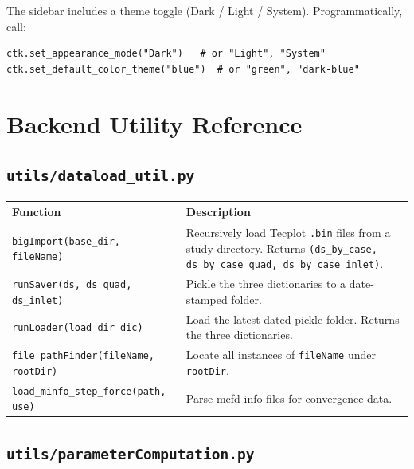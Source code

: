 \documentclass[11pt,letterpaper]{article}
\begin{document}
The sidebar includes a theme toggle (Dark / Light / System).
Programmatically, call:

\begin{lstlisting}
ctk.set_appearance_mode("Dark")   # or "Light", "System"
ctk.set_default_color_theme("blue")  # or "green", "dark-blue"
\end{lstlisting}

\section{Backend Utility Reference}

\subsection{\texttt{utils/dataload\_util.py}}

\begin{table}[h]
\centering
\small
\begin{tabular}{lp{8cm}}
\toprule
\textbf{Function} & \textbf{Description} \\
\midrule
\texttt{bigImport(base\_dir, fileName)} &
  Recursively load Tecplot \texttt{.bin} files from a study directory.
  Returns \texttt{(ds\_by\_case, ds\_by\_case\_quad, ds\_by\_case\_inlet)}.\\
\texttt{runSaver(ds, ds\_quad, ds\_inlet)} &
  Pickle the three dictionaries to a date-stamped folder.\\
\texttt{runLoader(load\_dir\_dic)} &
  Load the latest dated pickle folder. Returns the three dictionaries.\\
\texttt{file\_pathFinder(fileName, rootDir)} &
  Locate all instances of \texttt{fileName} under \texttt{rootDir}.\\
\texttt{load\_minfo\_step\_force(path, use)} &
  Parse mcfd info files for convergence data.\\
\bottomrule
\end{tabular}
\end{table}

\subsection{\texttt{utils/parameterComputation.py}}
\end{document}
